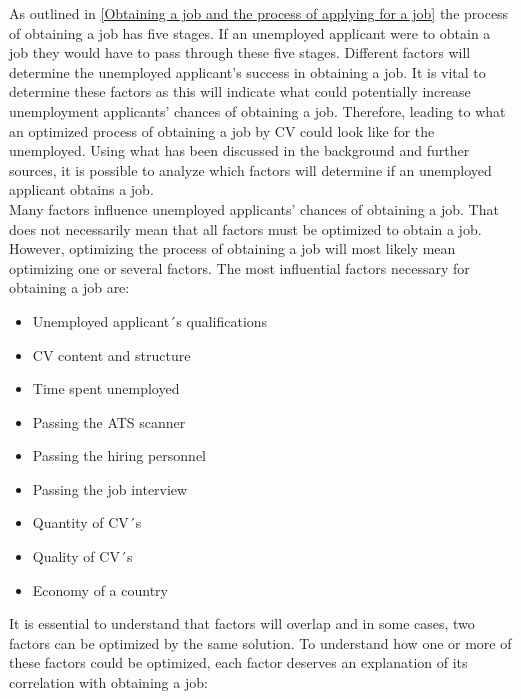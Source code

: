 As outlined in \ref{Obtaining a job and the process of applying for a job} the process of obtaining a job has five stages.
If an unemployed applicant were to obtain a job they would have to pass through these five stages.
Different factors will determine the unemployed applicant's success in obtaining a job.
It is vital to determine these factors as this will indicate what could potentially increase unemployment applicants' chances of obtaining a job.
Therefore, leading to what an optimized process of obtaining a job by CV could look like for the unemployed.
Using what has been discussed in the background and further sources, it is possible to analyze which factors will determine if an unemployed applicant obtains a job. \\

Many factors influence unemployed applicants' chances of obtaining a job.
That does not necessarily mean that all factors must be optimized to obtain a job.
However, optimizing the process of obtaining a job will most likely mean optimizing one or several factors.
The most influential factors necessary for obtaining a job are: \\
\begin{itemize}
  \item  Unemployed applicant´s qualifications
  \item  CV content and structure
  \item  Time spent unemployed
  \item  Passing the ATS scanner
  \item  Passing the hiring personnel
  \item  Passing the job interview
  \item  Quantity of CV´s 
  \item  Quality of CV´s
  \item  Economy of a country
\end{itemize} 
It is essential to understand that factors will overlap and in some cases, two factors can be optimized by the same solution.
To understand how one or more of these factors could be optimized, each factor deserves an explanation of its correlation with obtaining a job: \\

